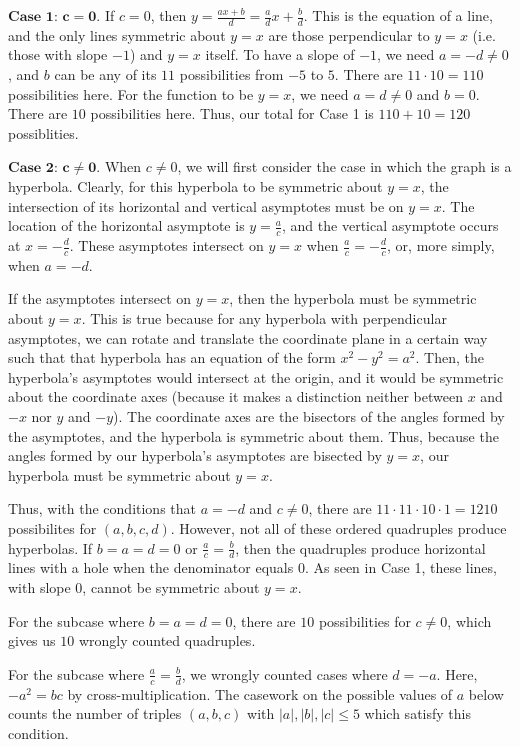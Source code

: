 \begin{enumerate}
 $\textbf{Case 1: }\mathbf{c=0.}$ If $c=0$, then $y=\frac{ax+b}d=\frac adx+\frac bd$. This is the equation of a line, and the only lines symmetric about $y=x$ are those perpendicular to $y=x$ (i.e. those with slope $-1$) and $y=x$ itself. To have a slope of $-1$, we need $a=-d\neq 0$, and $b$ can be any of its $11$ possibilities from $-5$ to $5$. There are $11\cdot 10=110$ possibilities here. For the function to be $y=x$, we need $a=d\neq 0$ and $b=0$. There are $10$ possibilities here. Thus, our total for Case 1 is $110+10=120$ possiblities.

 


 $\textbf{Case 2: }\mathbf{c\neq 0.}$ When $c\neq 0$, we will first consider the case in which the graph is a hyperbola. Clearly, for this hyperbola to be symmetric about $y=x$, the intersection of its horizontal and vertical asymptotes must be on $y=x$. The location of the horizontal asymptote is $y=\frac ac$, and the vertical asymptote occurs at $x=-\frac dc$. These asymptotes intersect on $y=x$ when $\frac ac = -\frac dc$, or, more simply, when $a=-d$.

 If the asymptotes intersect on $y=x$, then the hyperbola must be symmetric about $y=x$. This is true because for any hyperbola with perpendicular asymptotes, we can rotate and translate the coordinate plane in a certain way such that that hyperbola has an equation of the form $x^2-y^2=a^2$. Then, the hyperbola's asymptotes would intersect at the origin, and it would be symmetric about the coordinate axes (because it makes a distinction neither between $x$ and $-x$ nor $y$ and $-y$). The coordinate axes are the bisectors of the angles formed by the asymptotes, and the hyperbola is symmetric about them. Thus, because the angles formed by our hyperbola's asymptotes are bisected by $y=x$, our hyperbola must be symmetric about $y=x$.

 Thus, with the conditions that $a=-d$ and $c\neq 0$, there are $11\cdot 11\cdot 10\cdot 1=1210$ possibilites for $(a,b,c,d)$. However, not all of these ordered quadruples produce hyperbolas. If $b=a=d=0$ or $\frac ac=\frac bd$, then the quadruples produce horizontal lines with a hole when the denominator equals $0$. As seen in Case 1, these lines, with slope $0$, cannot be symmetric about $y=x$.

 For the subcase where $b=a=d=0$, there are $10$ possibilities for $c\neq 0$, which gives us $10$ wrongly counted quadruples.

 For the subcase where $\frac ac=\frac bd$, we wrongly counted cases where $d=-a$. Here, $-a^2=bc$ by cross-multiplication. The casework on the possible values of $a$ below counts the number of triples $(a,b,c)$ with $|a|,|b|,|c|\leq 5$ which satisfy this condition.


\end{enumerate}
